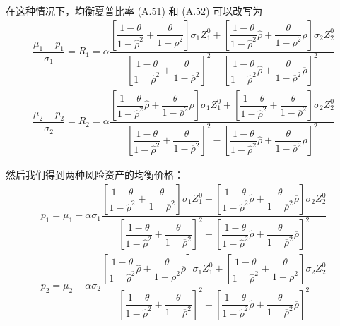 \documentclass[10.0pt]{article}
\begin{document}
在这种情况下，均衡夏普比率 (A.51) 和 (A.52) 可以改写为
\begin{eqnarray*}
& \dfrac{\mu_1 - p_1}{\sigma_1} = R_1 = \alpha \dfrac{\left[ \dfrac{1 - \theta}{1 - {\hat \rho}^2} + \dfrac{\theta}{1 - \overline{\rho}^2} \right] \sigma_1 Z_1^0 + \left[ \dfrac{1 - \theta}{1 - {\hat \rho}^2} {\hat \rho} + \dfrac{\theta}{1 - \overline{\rho}^2} \overline{\rho} \right] \sigma_2 Z_2^0}{\left[ \dfrac{1 - \theta}{1 - {\hat \rho}^2} + \dfrac{\theta}{1 - \overline{\rho}^2} \right]^2 - \left[ \dfrac{1 - \theta}{1 - {\hat \rho}^2} {\hat \rho} + \dfrac{\theta}{1 - \overline{\rho}^2} \overline{\rho} \right]^2} & \\
& \dfrac{\mu_2 - p_2}{\sigma_2} = R_2 = \alpha \dfrac{\left[ \dfrac{1 - \theta}{1 - {\hat \rho}^2} {\hat \rho} + \dfrac{\theta}{1 - \overline{\rho}^2} \overline{\rho} \right] \sigma_1 Z_1^0 + \left[ \dfrac{1 - \theta}{1 - {\hat \rho}^2} + \dfrac{\theta}{1 - \overline{\rho}^2} \right] \sigma_2 Z_2^0}{\left[ \dfrac{1 - \theta}{1 - {\hat \rho}^2} + \dfrac{\theta}{1 - \overline{\rho}^2} \right]^2 - \left[ \dfrac{1 - \theta}{1 - {\hat \rho}^2} {\hat \rho} + \dfrac{\theta}{1 - \overline{\rho}^2} \overline{\rho} \right]^2} &
\end{eqnarray*}

然后我们得到两种风险资产的均衡价格：
\begin{eqnarray}
& p_1 = \mu_1 - \alpha \sigma_1 \dfrac{\left[ \dfrac{1 - \theta}{1 - {\hat \rho}^2} + \dfrac{\theta}{1 - \overline{\rho}^2} \right] \sigma_1 Z_1^0 + \left[ \dfrac{1 - \theta}{1 - {\hat \rho}^2} {\hat \rho} + \dfrac{\theta}{1 - \overline{\rho}^2} \overline{\rho} \right] \sigma_2 Z_2^0}{\left[ \dfrac{1 - \theta}{1 - {\hat \rho}^2} + \dfrac{\theta}{1 - \overline{\rho}^2} \right]^2 - \left[ \dfrac{1 - \theta}{1 - {\hat \rho}^2} {\hat \rho} + \dfrac{\theta}{1 - \overline{\rho}^2} \overline{\rho} \right]^2} & \\
& p_2 = \mu_2 - \alpha \sigma_2 \dfrac{\left[ \dfrac{1 - \theta}{1 - {\hat \rho}^2} {\hat \rho} + \dfrac{\theta}{1 - \overline{\rho}^2} \overline{\rho} \right] \sigma_1 Z_1^0 + \left[ \dfrac{1 - \theta}{1 - {\hat \rho}^2} + \dfrac{\theta}{1 - \overline{\rho}^2} \right] \sigma_2 Z_2^0}{\left[ \dfrac{1 - \theta}{1 - {\hat \rho}^2} + \dfrac{\theta}{1 - \overline{\rho}^2} \right]^2 - \left[ \dfrac{1 - \theta}{1 - {\hat \rho}^2} {\hat \rho} + \dfrac{\theta}{1 - \overline{\rho}^2} \overline{\rho} \right]^2} &
\end{eqnarray}
\end{document}
